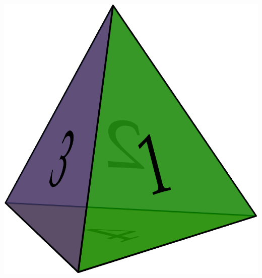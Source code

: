 \begin{examples}{}{}
\begin{enumerate}
\begin{minipage}[t]{0.3\linewidth}
  \flushright\href{https://www.math.uci.edu/~ndonalds/math120a/perm-a4.html}{\includegraphics[scale=0.14]{perm-a4.png}}
  \end{minipage}

\end{enumerate}
\end{examples}


